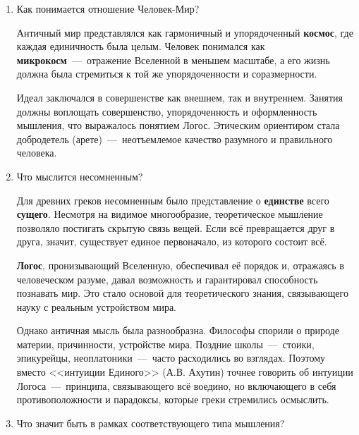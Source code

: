 \begin{enumerate}
    \item Как понимается отношение Человек-Мир?

Античный мир представлялся как гармоничный и упорядоченный \textbf{космос}, где каждая единичность была целым. Человек понимался как \textbf{микрокосм}~---~отражение Вселенной в меньшем масштабе, а его жизнь должна была стремиться к той же упорядоченности и соразмерности.

Идеал заключался в совершенстве как внешнем, так и внутреннем. Занятия должны воплощать совершенство, упорядоченность и оформленность мышления, что выражалось понятием Логос. Этическим ориентиром стала добродетель (арете)~---~неотъемлемое качество разумного и правильного человека.


\item Что мыслится несомненным?

Для древних греков несомненным было представление о \textbf{единстве} всего \textbf{сущего}. Несмотря на видимое многообразие, теоретическое мышление позволяло постигать скрытую связь вещей. Если всё превращается друг в друга, значит, существует единое первоначало, из которого состоит всё.

\textbf{Логос}, пронизывающий Вселенную, обеспечивал её порядок и, отражаясь в человеческом разуме, давал возможность и гарантировал способность познавать мир. Это стало основой для теоретического знания, связывающего науку с реальным устройством мира.

Однако античная мысль была разнообразна. Философы спорили о природе материи, причинности, устройстве мира. Поздние школы~---~стоики, эпикурейцы, неоплатоники~---~часто расходились во взглядах. Поэтому вместо <<интуиции Единого>> (А.В. Ахутин) точнее говорить об интуиции Логоса~---~принципа, связывающего всё воедино, но включающего в себя противоположности и парадоксы, которые греки стремились осмыслить.

\item Что значит быть в рамках соответствующего типа мышления?



\end{enumerate}
